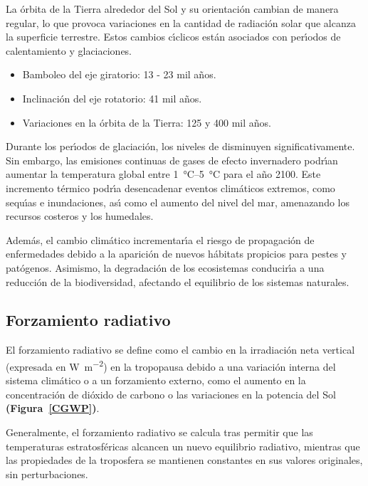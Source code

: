 La \'orbita de la Tierra alrededor del Sol y su orientaci\'on cambian de manera regular, lo que provoca variaciones en la cantidad de radiaci\'on solar que alcanza la superficie terrestre. Estos cambios c\'{\i}clicos est\'an asociados con per\'{\i}odos de calentamiento y glaciaciones. 

\begin{itemize}
    \item Bamboleo del eje giratorio: 13 - 23 mil a\~nos.
    \item Inclinaci\'on del eje rotatorio: 41 mil a\~nos.
    \item Variaciones en la \'orbita de la Tierra: 125 y 400 mil a\~nos.
\end{itemize}

Durante los per\'{\i}odos de glaciaci\'on, los niveles de  disminuyen significativamente. Sin embargo, las emisiones continuas de gases de efecto invernadero podr\'{\i}an aumentar la temperatura global entre \SIrange{1}{5}{\celsius}  para el a\~no 2100. Este incremento t\'ermico podr\'{\i}a desencadenar eventos clim\'aticos extremos, como sequ\'{\i}as e inundaciones, as\'{\i} como el aumento del nivel del mar, amenazando los recursos costeros y los humedales.

Adem\'as, el cambio clim\'atico incrementar\'{\i}a el riesgo de propagaci\'on de enfermedades debido a la aparici\'on de nuevos h\'abitats propicios para pestes y pat\'ogenos. Asimismo, la degradaci\'on de los ecosistemas conducir\'{\i}a a una reducci\'on de la biodiversidad, afectando el equilibrio de los sistemas naturales.

\subsection{Forzamiento radiativo}\label{fradia}

El forzamiento radiativo se define como el cambio en la irradiaci\'on neta vertical (expresada en \si{\watt\per\square\metre}) en la tropopausa debido a una variaci\'on interna del sistema clim\'atico o a un forzamiento externo, como el aumento en la concentraci\'on de di\'oxido de carbono o las variaciones en la potencia del Sol \textbf{(Figura~\ref{CGWP})}. 

Generalmente, el forzamiento radiativo se calcula tras permitir que las temperaturas estratosf\'ericas alcancen un nuevo equilibrio radiativo, mientras que las propiedades de la troposfera se mantienen constantes en sus valores originales, sin perturbaciones. 


